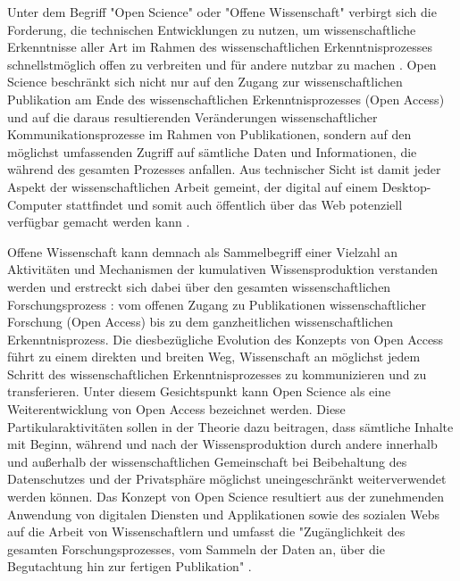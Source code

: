 Unter dem Begriff "Open Science" oder "Offene Wissenschaft" verbirgt sich die Forderung, die technischen Entwicklungen zu nutzen, um wissenschaftliche Erkenntnisse aller Art im Rahmen des wissenschaftlichen Erkenntnisprozesses schnellstmöglich offen zu verbreiten und für andere nutzbar zu machen \cite{stafford_2010_science}. Open Science beschränkt sich nicht nur auf den Zugang zur wissenschaftlichen Publikation am Ende des wissenschaftlichen Erkenntnisprozesses (Open Access) und auf die daraus resultierenden Veränderungen wissenschaftlicher Kommunikationsprozesse im Rahmen von Publikationen, sondern auf den möglichst umfassenden Zugriff auf sämtliche Daten und Informationen, die während des gesamten Prozesses anfallen. Aus technischer Sicht ist damit jeder Aspekt der wissenschaftlichen Arbeit gemeint, der digital auf einem Desktop-Computer stattfindet und somit auch öffentlich über das Web potenziell verfügbar gemacht werden kann \cite{mietchen2012wissenschaft}.

Offene Wissenschaft kann demnach als Sammelbegriff einer Vielzahl an Aktivitäten und Mechanismen der kumulativen Wissensproduktion verstanden werden \cite{Mukherjee_2009} und erstreckt sich dabei über den gesamten wissenschaftlichen Forschungsprozess \cite{Scheliga_2014}: vom offenen Zugang zu Publikationen wissenschaftlicher Forschung (Open Access) bis zu dem ganzheitlichen wissenschaftlichen Erkenntnisprozess. Die diesbezügliche Evolution des Konzepts von Open Access führt zu einem direkten und breiten Weg, Wissenschaft an möglichst jedem Schritt des wissenschaftlichen Erkenntnisprozesses zu kommunizieren und zu transferieren. Unter diesem Gesichtspunkt kann Open Science als eine Weiterentwicklung von Open Access bezeichnet werden. Diese Partikularaktivitäten sollen in der Theorie dazu beitragen, dass sämtliche Inhalte mit Beginn, während und nach der Wissensproduktion durch andere innerhalb und außerhalb der wissenschaftlichen Gemeinschaft bei Beibehaltung des Datenschutzes und der Privatsphäre möglichst uneingeschränkt weiterverwendet werden können. Das Konzept von Open Science resultiert aus der zunehmenden Anwendung von digitalen Diensten und Applikationen sowie des sozialen Webs auf die Arbeit von Wissenschaftlern und umfasst die "Zugänglichkeit des gesamten Forschungsprozesses, vom Sammeln der Daten an, über die Begutachtung hin zur fertigen Publikation" \cite{brembs2015open}.


